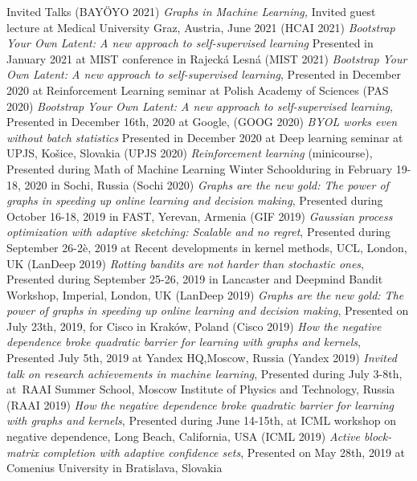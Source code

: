\documentclass{resume}
\begin{document}
\begin{category}{Invited Talks}
({\sf BAY\"OYO  2021})
\citembullet
\emph{Graphs in Machine Learning,} 
Invited guest lecture at Medical University Graz, Austria, June 2021
({\sf HCAI  2021})
\citembullet
\emph{Bootstrap Your Own Latent: A new approach to self-supervised learning} 
Presented in January  2021 at MIST conference in Rajeck\' a Lesn\' a 
({\sf MIST  2021})
\citembullet
\emph{Bootstrap Your Own Latent: A new approach to self-supervised learning}, 
 Presented in December  2020 at Reinforcement Learning seminar at Polish Academy of Sciences
({\sf PAS  2020})
\citembullet
\emph{Bootstrap Your Own Latent: A new approach to self-supervised learning}, 
Presented in December 16th, 2020 at Google,
({\sf GOOG  2020})
\citembullet
\emph{BYOL works even without batch statistics} 
Presented in December  2020 at Deep learning seminar at UPJS, Ko\v{s}ice, Slovakia
({\sf UPJS  2020})
\citembullet
\emph{Reinforcement learning} (minicourse),
Presented during Math of Machine Learning Winter Schoolduring in February 19-18, 2020 in Sochi, Russia 
({\sf Sochi  2020})
\citembullet
\emph{Graphs are the new gold: The power of graphs in speeding up online learning and decision making},
Presented during October 16-18, 2019 in FAST, Yerevan, Armenia 
({\sf GIF  2019})
\citembullet
\emph{Gaussian process optimization with adaptive sketching: Scalable and no regret},
Presented during September 26-2è, 2019 at Recent developments in kernel methods, UCL, London, UK
({\sf LanDeep 2019})
\citembullet
\emph{Rotting bandits are not harder than stochastic ones},
Presented during September 25-26, 2019 in Lancaster and Deepmind Bandit Workshop, Imperial, London, UK
({\sf LanDeep 2019})
\citembullet
\emph{Graphs are the new gold: The power of graphs in speeding up online learning and decision making},
Presented on July 23th, 2019, for Cisco in Krak\'ow, Poland
({\sf Cisco  2019})
\citembullet
\emph{How the negative dependence broke quadratic barrier for learning with graphs and kernels},
Presented July 5th, 2019 at Yandex HQ,Moscow, Russia
({\sf Yandex  2019})
\citembullet
\emph{Invited talk on research achievements in machine learning},
Presented during July 3-8th, at~RAAI Summer School, Moscow Institute of Physics and Technology, Russia
({\sf RAAI  2019})
\citembullet
\emph{How the negative dependence broke quadratic barrier for learning with graphs and kernels},
Presented during June 14-15th, at ICML workshop on negative dependence, Long Beach, California, USA 
({\sf ICML  2019})
\citembullet
\emph{Active block-matrix completion with adaptive confidence sets}, Presented on May 28th, 2019 at Comenius University in Bratislava, Slovakia 

\end{category}
\end{document}
